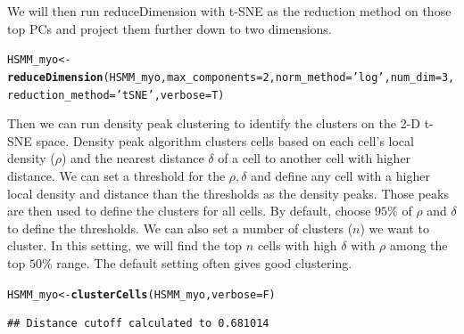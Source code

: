 \documentclass[10pt,oneside]{article}\usepackage[]{graphicx}\usepackage[]{color}
\makeatletter
\newcommand{\hlnum}[1]{\textcolor[rgb]{0.686,0.059,0.569}{#1}}%
\newcommand{\hlstr}[1]{\textcolor[rgb]{0.192,0.494,0.8}{#1}}%
\newcommand{\hlstd}[1]{\textcolor[rgb]{0.345,0.345,0.345}{#1}}%
\newcommand{\hlkwb}[1]{\textcolor[rgb]{0.69,0.353,0.396}{#1}}%
\newcommand{\hlkwc}[1]{\textcolor[rgb]{0.333,0.667,0.333}{#1}}%
\newcommand{\hlkwd}[1]{\textcolor[rgb]{0.737,0.353,0.396}{\textbf{#1}}}%
\newenvironment{kframe}{%
 \def\at@end@of@kframe{}%
 \ifinner\ifhmode%
  \def\at@end@of@kframe{\end{minipage}}%
  \begin{minipage}{\columnwidth}%
 \fi\fi%
 \def\FrameCommand##1{\hskip\@totalleftmargin \hskip-\fboxsep
 \colorbox{shadecolor}{##1}\hskip-\fboxsep
     \hskip-\linewidth \hskip-\@totalleftmargin \hskip\columnwidth}%
 \MakeFramed {\advance\hsize-\width
   \@totalleftmargin\z@ \linewidth\hsize
   \@setminipage}}%
 {\par\unskip\endMakeFramed%
 \at@end@of@kframe}
\newenvironment{knitrout}{}{} %
\makeatother
\begin{document}
We will then run reduceDimension with t-SNE as the reduction method on those top PCs and project them further down to two dimensions.  
\begin{knitrout}
\color{fgcolor}\begin{kframe}
\begin{alltt}
  \hlstd{HSMM_myo} \hlkwb{<-} \hlkwd{reduceDimension}\hlstd{(HSMM_myo,} \hlkwc{max_components}\hlstd{=}\hlnum{2}\hlstd{,} \hlkwc{norm_method} \hlstd{=} \hlstr{'log'}\hlstd{,} \hlkwc{num_dim} \hlstd{=} \hlnum{3}\hlstd{,}
                              \hlkwc{reduction_method} \hlstd{=} \hlstr{'tSNE'}\hlstd{,} \hlkwc{verbose} \hlstd{= T)}
\end{alltt}


{\ttfamily\noindent\itshape\color{messagecolor}{\#\# Remove noise by PCA ...}}

{\ttfamily\noindent\itshape\color{messagecolor}{\#\# Reduce dimension by tSNE ...}}\end{kframe}
\end{knitrout}

Then we can run density peak clustering to identify the clusters on the 2-D t-SNE space. Density peak algorithm clusters cells based on each 
cell's local density ($\rho$) and the nearest distance $\delta$ of a cell to another cell with higher distance. We can set a threshold for 
the $\rho, \delta$ and define any cell with a higher local density and distance than the thresholds as the density peaks. Those peaks are then 
used to define the clusters for all cells. By default,  choose $95\%$ of $\rho$ and $\delta$ to define 
the thresholds. We can also set a number of clusters ($n$) we want to cluster. In this setting, we will find the top $n$ cells with high 
$\delta$ with $\rho$ among the top $50\%$ range. The default setting often gives good clustering. 

\begin{knitrout}
\color{fgcolor}\begin{kframe}
\begin{alltt}
\hlstd{HSMM_myo} \hlkwb{<-} \hlkwd{clusterCells}\hlstd{(HSMM_myo,} \hlkwc{verbose} \hlstd{= F)}
\end{alltt}
\begin{verbatim}
## Distance cutoff calculated to 0.681014
\end{verbatim}


{\ttfamily\noindent\itshape\color{messagecolor}{\#\# the length of the distance: 11935}}\end{kframe}
\end{knitrout}
\end{document}
